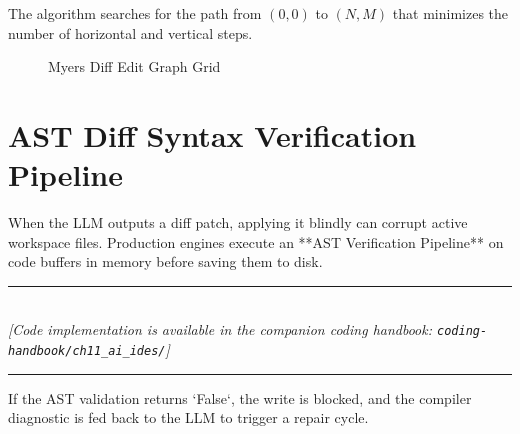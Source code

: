 The algorithm searches for the path from $(0,0)$ to $(N,M)$ that minimizes the number of horizontal and vertical steps.

\begin{figure}[h]
\centering
{}
\caption{Myers Diff Edit Graph Grid}
\end{figure}

\section{AST Diff Syntax Verification Pipeline}

When the LLM outputs a diff patch, applying it blindly can corrupt active workspace files. Production engines execute an **AST Verification Pipeline** on code buffers in memory before saving them to disk.


\begin{center}
\noindent\rule{0.6\textwidth}{0.4pt} \\
\vspace{0.3em}
\textit{[Code implementation is available in the companion coding handbook: \texttt{coding-handbook/ch11\_ai\_ides/}]} \\
\noindent\rule{0.6\textwidth}{0.4pt}
\end{center}


If the AST validation returns `False`, the write is blocked, and the compiler diagnostic is fed back to the LLM to trigger a repair cycle.

